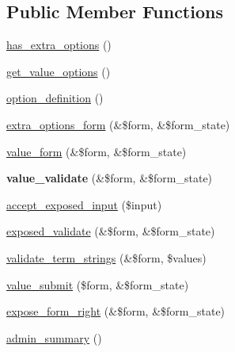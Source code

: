 \subsection*{Public Member Functions}
\begin{CompactItemize}
\item 
\hyperlink{classviews__handler__filter__term__node__tid_72232eda675756741ce92061cb4685ee}{has\_\-extra\_\-options} ()
\item 
\hyperlink{classviews__handler__filter__term__node__tid_78e569201a5b833da4aafbf325a77c44}{get\_\-value\_\-options} ()
\item 
\hyperlink{classviews__handler__filter__term__node__tid_e81fb582295a2c8871b32bbf8b3ea915}{option\_\-definition} ()
\item 
\hyperlink{classviews__handler__filter__term__node__tid_df599d1bef08003b1b734dfd397030a6}{extra\_\-options\_\-form} (\&\$form, \&\$form\_\-state)
\item 
\hyperlink{classviews__handler__filter__term__node__tid_3259d8a91cb0c13c51c02942b267b131}{value\_\-form} (\&\$form, \&\$form\_\-state)
\item 
\hypertarget{classviews__handler__filter__term__node__tid_b69352af493de3553ae07f1beee6566a}{
\textbf{value\_\-validate} (\&\$form, \&\$form\_\-state)}
\label{classviews__handler__filter__term__node__tid_b69352af493de3553ae07f1beee6566a}

\item 
\hyperlink{classviews__handler__filter__term__node__tid_75f38674ff356981f6e77f009da2101a}{accept\_\-exposed\_\-input} (\$input)
\item 
\hyperlink{classviews__handler__filter__term__node__tid_b0c4583fea802e86c84fabafc4768074}{exposed\_\-validate} (\&\$form, \&\$form\_\-state)
\item 
\hyperlink{classviews__handler__filter__term__node__tid_762ab62bf1d1431daedea8f5d344bba4}{validate\_\-term\_\-strings} (\&\$form, \$values)
\item 
\hyperlink{classviews__handler__filter__term__node__tid_48244c2456ac78e1855d9a48632ce045}{value\_\-submit} (\$form, \&\$form\_\-state)
\item 
\hyperlink{classviews__handler__filter__term__node__tid_6a3523271cc4bd41ae944dd38bf24b37}{expose\_\-form\_\-right} (\&\$form, \&\$form\_\-state)
\item 
\hyperlink{classviews__handler__filter__term__node__tid_392046588b13b1b76223eb22ba4ff660}{admin\_\-summary} ()
\end{CompactItemize}


